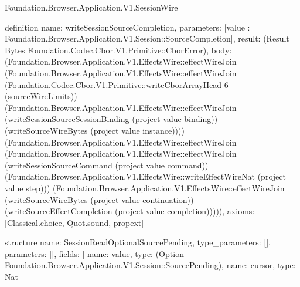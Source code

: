 \begin{lexlean}{Foundation.Browser.Application.V1.SessionWire}
\begin{semanticmodule}
definition{
  name: writeSessionSourceCompletion,
  parameters: [value : Foundation.Browser.Application.V1.Session::SourceCompletion],
  result: (Result Bytes Foundation.Codec.Cbor.V1.Primitive::CborError),
  body: (Foundation.Browser.Application.V1.EffectsWire::effectWireJoin (Foundation.Browser.Application.V1.EffectsWire::effectWireJoin (Foundation.Codec.Cbor.V1.Primitive::writeCborArrayHead 6 (sourceWireLimits)) (Foundation.Browser.Application.V1.EffectsWire::effectWireJoin (writeSessionSourceSessionBinding (project value binding)) (writeSourceWireBytes (project value instance)))) (Foundation.Browser.Application.V1.EffectsWire::effectWireJoin (Foundation.Browser.Application.V1.EffectsWire::effectWireJoin (writeSessionSourceCommand (project value command)) (Foundation.Browser.Application.V1.EffectsWire::writeEffectWireNat (project value step))) (Foundation.Browser.Application.V1.EffectsWire::effectWireJoin (writeSourceWireBytes (project value continuation)) (writeSourceEffectCompletion (project value completion))))),
  axioms: [Classical.choice, Quot.sound, propext]
}

structure{
  name: SessionReadOptionalSourcePending,
  type_parameters: [],
  parameters: [],
  fields: [
    {name: value, type: (Option Foundation.Browser.Application.V1.Session::SourcePending)},
    {name: cursor, type: Nat}
  ]
}


\end{semanticmodule}
\end{lexlean}
